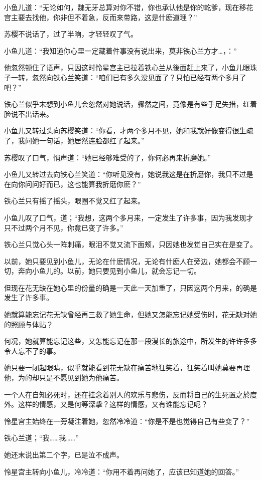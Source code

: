 \documentclass[12pt,oneside]{book}
\begin{document}
小鱼儿道：``无论如何，魏无牙总算对你不错，你也承认他是你的乾爹，现在移花宫主要去找他，你非但不着急，反而来带路，这是什麽道理？''

苏樱不说话了，过了半晌，才轻轻叹了气。

小鱼儿道：``我知道你心里一定藏着件事没有说出来，莫非铁心兰方才\ldots，：''

他忽然顿住了语声，只因这时怜星宫主已拉着铁心兰从後面赶上来了，小鱼儿眼珠子一转，忽然向铁心兰笑道：``咱们已有多久没见面了？只怕已经有两个多月了吧？''

铁心兰似乎末想到小鱼儿会忽然对她说话，骤然之间，竟像是有些手足失措，红着脸说不出话来。

小鱼儿又转过头向苏樱笑道：``你看，才两个多月不见，她和我就好像变得很生疏了，我问她一句话，她居然连脸都红了起来。''

苏樱叹了口气，悄声道：``她已经够难受的了，你何必再来折磨她。''

小鱼儿又转过去向铁心兰笑道：``你听见没有，她说我这是在折磨你，我只不过是在向你问问好而已，这也能算我折磨你麽？''

铁心兰只有摇了摇头，眼圈不觉又红了起来。

小鱼儿叹了口气，道；``我想，这两个多月来，一定发生了许多事，因为我发现才只不过两个月不见，你竟已变了许多。''

铁心兰只觉心头一阵刺痛，眼泪不觉又流下面颊，只因她也发觉自己实在是变了。

以前，她只要见到小鱼儿，无论在什麽情况，无论有什麽人在旁边，她都会不顾一切，奔向小鱼儿的。以前，她只要见到小鱼儿，就会忘记一切。

但现在花无缺在她心里的份量的确是一天此一天加重了，只因这两个月来，的确是发生了许多事。

她就算能忘记花无缺曾经再三救了她生命，但她又怎能忘记她受伤时，花无缺对她的照顾与体贴？

何况，她就算能忘记这些，又怎能忘记在那一段漫长的旅途中，所发生的许许多多令人忘不了的事。

她只要一闭起眼睛，似乎就能看到花无缺在痛苦地狂笑着，狂笑着叫她莫要再理他，为的却只是不愿见到她为他痛苦。

一个人在自知必死时，还在挂念着别人的欢乐与悲伤，反而将自己的生死置之於度外。这样的情感，又是何等深挚？这样的情感，又有谁能忘记呢？

怜星宫主始终在一旁凝注着她，忽然冷冷道：``你是不是也觉得自己有些变了？''

铁心兰道；``我\ldots\ldots 我\ldots\ldots{}''

她还末说出第二个字，已是泣不成声。

怜星宫主转向小鱼儿，冷冷道：``你用不着再问她了，应该已知道她的回答。''
\end{document}
